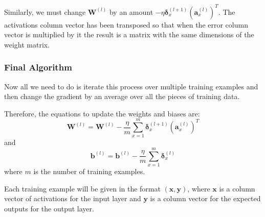 \documentclass[12pt]{report}
\begin{document}
Similarly, we must change $\mathbf{W}^{\left(l\right)}$ by an amount $-\eta \bm{\delta}^{\left(l+1\right)}_x{\left(\mathbf{a}^{\left(l\right)}_x\right)}^T$. The activations column vector has been transposed so that when the error column vector is multiplied by it the result is a matrix with the same dimensions of the weight matrix.

\subsubsection{Final Algorithm}
Now all we need to do is iterate this process over multiple training examples and then change the gradient by an average over all the pieces of training data.

Therefore, the equations to update the weights and biases are:
\begin{equation}\label{eq:updateWeights}
    \mathbf{W}^{\left(l\right)}=\mathbf{W}^{\left(l\right)}-\frac{\eta}{m}\displaystyle\sum_{x=1}^{m}\bm{\delta}^{\left(l+1\right)}_x{\left(\mathbf{a}^{\left(l\right)}_x\right)}^T
\end{equation}
and
\begin{equation}\label{eq:updateBiases}
    \mathbf{b}^{\left(l\right)}=\mathbf{b}^{\left(l\right)}-\frac{\eta}{m}\displaystyle\sum_{x=1}^{m}\bm{\delta}^{\left(l\right)}_x
\end{equation}
where $m$ is the number of training examples.

Each training example will be given in the format $\left(\mathbf{x},\mathbf{y}\right)$, where $\mathbf{x}$ is a column vector of activations for the input layer and $\mathbf{y}$ is a column vector for the expected outputs for the output layer.
\end{document}
